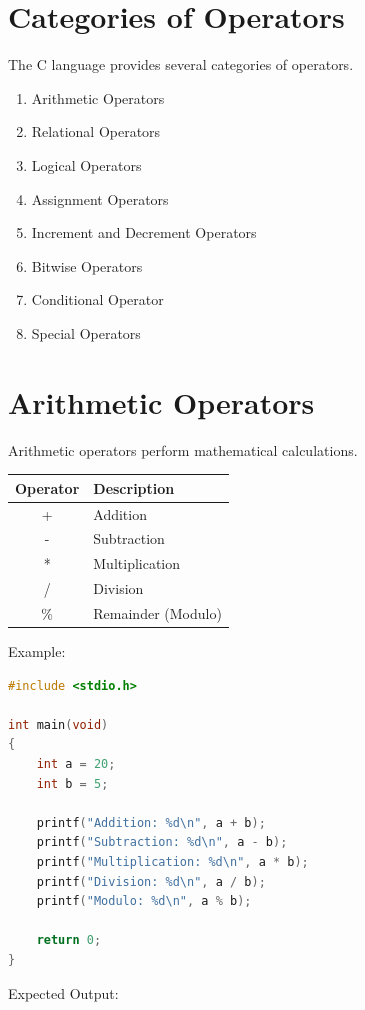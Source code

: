\documentclass[12pt,openany]{book}
\begin{document}
\section{Categories of Operators}

The C language provides several categories of operators.

\begin{enumerate}
\item Arithmetic Operators
\item Relational Operators
\item Logical Operators
\item Assignment Operators
\item Increment and Decrement Operators
\item Bitwise Operators
\item Conditional Operator
\item Special Operators
\end{enumerate}
\section{Arithmetic Operators}

Arithmetic operators perform mathematical calculations.

\begin{center}
\begin{tabular}{|c|l|}
\hline
Operator & Description\\
\hline
+ & Addition\\
- & Subtraction\\
* & Multiplication\\
/ & Division\\
\% & Remainder (Modulo)\\
\hline
\end{tabular}
\end{center}

Example:

\begin{lstlisting}[language=C]
#include <stdio.h>

int main(void)
{
    int a = 20;
    int b = 5;

    printf("Addition: %d\n", a + b);
    printf("Subtraction: %d\n", a - b);
    printf("Multiplication: %d\n", a * b);
    printf("Division: %d\n", a / b);
    printf("Modulo: %d\n", a % b);

    return 0;
}
\end{lstlisting}

Expected Output:
\end{document}
